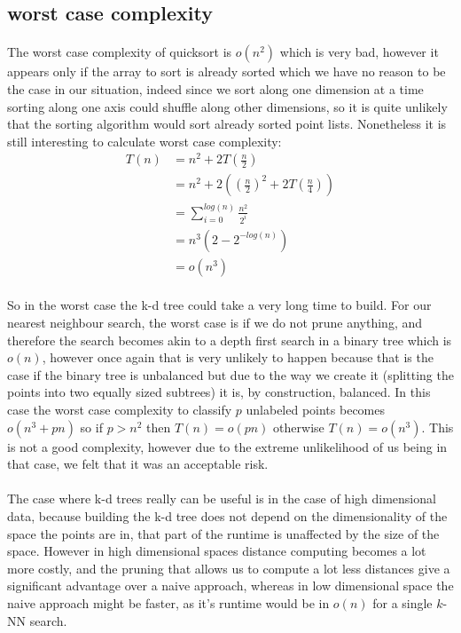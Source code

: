 \documentclass[11 pt]{article}
\begin{document}
\subsection{worst case complexity}
\paragraph{}The worst case complexity of quicksort is $o(n^2)$ which is very bad, however it appears only if the array to sort is already sorted which we have no reason to be the case in our situation, indeed since we sort along one dimension at a time sorting along one axis could shuffle along other dimensions, so it is quite unlikely that the sorting algorithm would sort already sorted point lists. Nonetheless it is still interesting to calculate worst case complexity:\\
\begin{align*}
  T(n) &= n^2 +2T\left(\frac{n}{2}\right)\\
       &= n^2 +2\left(\left(\frac{n}{2}\right)^2+2T\left(\frac{n}{4}\right)\right)\\
       &= \sum^{log(n)}_{i=0}\frac{n^2}{2^i}\\
       &= n^3(2-2^{-log(n)})\\
       &= o(n^3)
\end{align*}
\paragraph{}So in the worst case the k-d tree could take a very long time to build. For our nearest neighbour search, the worst case is if we do not prune anything, and therefore the search becomes akin to a depth first search in a binary tree which is $o(n)$, however once again that is very unlikely to happen because that is the case if the binary tree is unbalanced but due to the way we create it (splitting the points into two equally sized subtrees) it is, by construction, balanced. In this case the worst case complexity to classify $p$ unlabeled points becomes $o(n^3+pn)$ so if $p>n^2$ then $T(n)=o(pn)$ otherwise $T(n)=o(n^3)$. This is not a good complexity, however due to the extreme unlikelihood of us being in that case, we felt that it was an  acceptable risk.
\medskip
\paragraph{}The case where k-d trees really can be useful is in the case of high dimensional data, because building the k-d tree does not depend on the dimensionality of the space the points are in, that part of the runtime is unaffected by the size of the space. However in high dimensional spaces distance computing becomes a lot more costly, and the pruning that allows us to compute a lot less distances give a significant advantage over a naive approach, whereas in low dimensional space the naive approach might be faster, as it's runtime would be in $o(n)$ for a single $k$-NN search.
\end{document}
